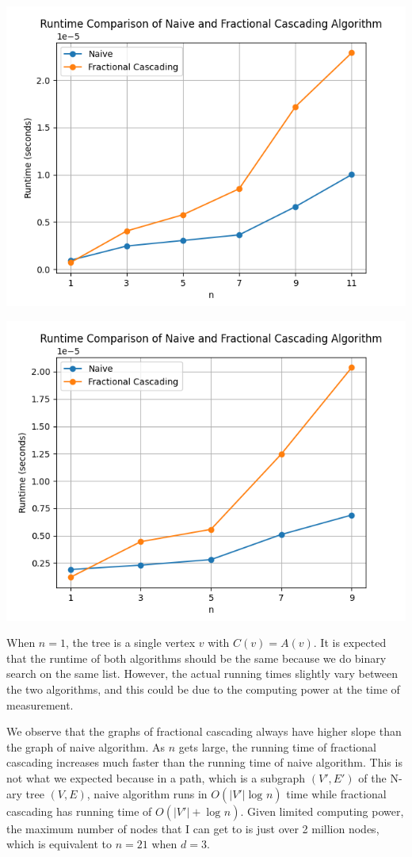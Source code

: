 \documentclass[12pt,english,]{article}
\let\origfigure\figure
\let\endorigfigure\endfigure
\renewenvironment{figure}[1][2] {
    \expandafter\origfigure\expandafter[H]
} {
    \endorigfigure
}
\begin{document}
\begin{figure}

{\centering \includegraphics[width=0.7\linewidth]{images/5_2} 

}

\caption{Running time of path 2 on $d=5$.}\label{fig:graph7}
\end{figure}

\begin{figure}

{\centering \includegraphics[width=0.7\linewidth]{images/6_2} 

}

\caption{Running time of path 2 on $d=6$.}\label{fig:graph8}
\end{figure}

When $n=1$, the tree is a single vertex $v$ with $C(v)=A(v)$. It is expected that the runtime
of both algorithms should be the same because we do binary search on the same list. However,
the actual running times slightly vary between the two algorithms, and this could be due to
the computing power at the time of measurement.

We observe that the graphs of fractional cascading always have higher slope than the graph of
naive algorithm. As $n$ gets large, the running time of fractional cascading increases much
faster than the running time of naive algorithm. This is not what we expected because in a
path, which is a subgraph $(V', E')$ of the N-ary tree $(V,E)$, naive algorithm runs in
$O(|V'|\log_{} n)$ time while fractional cascading has running time of $O(|V'|+\log_{} n)$.
Given limited computing power, the maximum number of nodes that I can get to is just over 2
million nodes, which is equivalent to $n=21$ when $d=3$.
\end{document}
